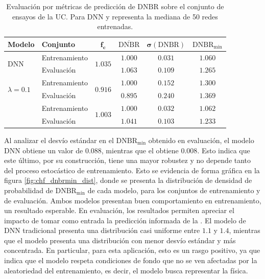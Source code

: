\begin{table}[H]
	\centering
	\caption{Evaluación por métricas de predicción de $\mathrm{DNBR}$ sobre el conjunto de ensayos de la UC. Para DNN y \mfdnn{} representa la mediana de 50 redes entrenadas.}
	\begin{tabular}{p{2cm} l c c c c} 
        \toprule
        \textbf{Modelo} & \textbf{Conjunto} & $\bm{f_c}$ & $\bm{\overline{\mathrm{DNBR}}}$ & $\bm{\sigma(\mathrm{DNBR})}$ & $\bm{\mathrm{DNBR}_\mathrm{min}}$ \\ \hline
        \multirow{2}{*}{DNN}     
                & Entrenamiento & \multirow{2}{*}{$1.035$}
                                        & $1.000$ & $0.031$ & $1.060$ \\
                & Evaluación    &       & $1.063$ & $0.109$ & $1.265$ \\
        \multirow{2}{=}{\lfpinn{} $\lambda=0.1$}     
                & Entrenamiento & \multirow{2}{*}{$0.916$}
                                        & $1.000$ & $0.152$ & $1.300$ \\
                & Evaluación    &       & $0.895$ & $0.240$ & $1.369$ \\
        \multirow{2}{*}{\mfdnn{}}     
                & Entrenamiento & \multirow{2}{*}{$1.003$}
                                        & $1.000$ & $0.032$ & $1.062$ \\
                & Evaluación    &       & $1.041$ & $0.103$ & $1.233$ \\
		\bottomrule
	\end{tabular}
	\label{tab:mf_dnbr}
\end{table}

Al analizar el desvío estándar en el $\mathrm{DNBR}_\mathrm{min}$ obtenido en evaluación, el modelo DNN obtiene un valor de $0.088$, mientras que el \mfdnn{} obtiene $0.008$. Esto indica que este último, por su construcción, tiene una mayor robustez y no depende tanto del proceso estocástico de entrenamiento. Esto se evidencia de forma gráfica en la figura \ref{fig:chf_dnbrmin_dist}, donde se presenta la distribución de densidad de probabilidad de $\mathrm{DNBR}_\mathrm{min}$ de cada modelo, para los conjuntos de entrenamiento y de evaluación. Ambos modelos presentan buen comportamiento en entrenamiento, un resultado esperable. En evaluación, los resultados permiten apreciar el impacto de tomar como entrada la predicción informada de la \lfpinn{}. El modelo de DNN tradicional presenta una distribución casi uniforme entre $1.1$ y $1.4$, mientras que el modelo \mfdnn{} presenta una distribución con menor desvío estándar y más concentrada. En particular, para esta aplicación, esto es un rasgo positivo, ya que indica que el modelo respeta condiciones de fondo que no se ven afectadas por la aleatoriedad del entrenamiento, es decir, el modelo busca representar la física.


